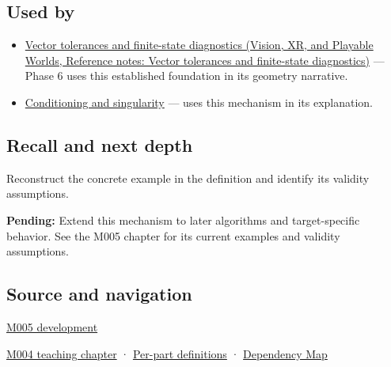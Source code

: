 \subsection{Used by}\label{appendix-0ec599f8ba27-used-by}

\begin{itemize}
\item
  \href{../07-Vision-XR-and-Playable-Worlds/main.pdf\#nameddest=appendix-b5b83329215b}{Vector tolerances and finite-state diagnostics (Vision, XR, and Playable Worlds, Reference notes: Vector tolerances and finite-state diagnostics)} --- Phase 6 uses this established foundation in its geometry narrative.
\item
  \hyperref[appendix-8f6a01f284a7]{Conditioning and singularity} --- uses this mechanism in its explanation.
\end{itemize}

\subsection{Recall and next depth}\label{appendix-0ec599f8ba27-recall-and-next-depth}

Reconstruct the concrete example in the definition and identify its validity assumptions.

\textbf{Pending:} Extend this mechanism to later algorithms and target-specific behavior. See the M005 chapter for its current examples and validity assumptions.

\subsection{Source and navigation}\label{appendix-0ec599f8ba27-source-and-navigation}

\hyperref[01-foundations-i-ch001-when-arithmetic-meets-uncertainty]{M005 development}

\hyperref[01-foundations-i-ch001-a-stretching-ruler-for-real-valued-quantities]{M004 teaching chapter} · \hyperref[appendix-fd090d982a15-m004---parts-61-76]{Per-part definitions} · \hyperref[appendix-4ad47bdd269a]{Dependency Map}
